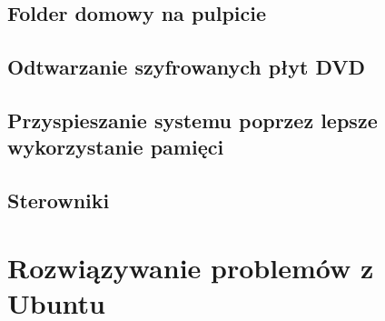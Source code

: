 \documentclass[a4paper,11pt,oneside]{mwart}
\begin{document}
		\subsection{Folder domowy na pulpicie}
			
		\subsection{Odtwarzanie szyfrowanych płyt DVD}
			
		\subsection{Przyspieszanie systemu poprzez lepsze wykorzystanie pamięci}
			
		\subsection{Sterowniki} 
	\section{Rozwiązywanie problemów z Ubuntu}
\end{document}
